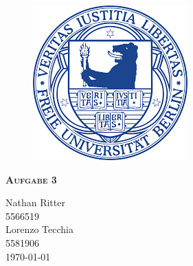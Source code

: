 \documentclass{report}
\begin{document}
\begin{center}
	
\end{center}
    \begin{figure}[htb]
            \centering\includegraphics[width=.5\textwidth]{Immagini/FUlogo.png}
    \end{figure}
    

 {\centering\scshape\LARGE\bfseries Aufgabe 3
    \begin{center}
        Nathan Ritter  \\ 5566519 \\
        Lorenzo Tecchia \\ 5581906  \\ \today
    \end{center}}


    \newpage
    
    \tableofcontents
    \listoffigures
    \listoftables
    
	
    
    
    
    
    
    \printbibliography
    
\end{document}
